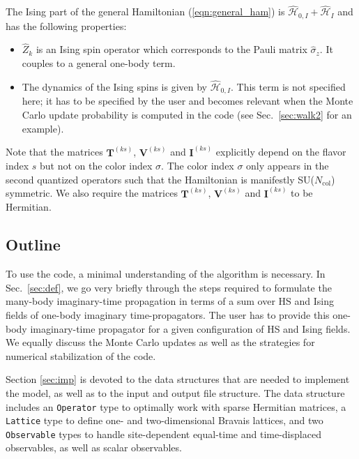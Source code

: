 The Ising part of the general Hamiltonian (\ref{eqn:general_ham}) is $\hat{\mathcal{H}}_{0,I}+ \hat{\mathcal{H}}_{I}$ and  has the following properties:
\begin{itemize}
\item $\hat{Z}_k$ is an Ising spin operator which corresponds to the Pauli matrix $\hat{\sigma}_{z}$. It couples to a general one-body term. 
\item  The dynamics of the Ising spins is given by $\hat{\mathcal{H}}_{0,I}$. This term is not specified here; 
it has to be specified by the user and becomes relevant when the Monte Carlo update probability is computed in the code (see Sec.~\ref{sec:walk2} for an example).
\end{itemize}
Note that the matrices  $\bm{T}^{(ks)}$,  $\bm{V}^{(ks)}$ and  $\bm{I}^{(ks)}$ explicitly depend on the flavor index $s$ but not on the color index $\sigma$. 
The color index $\sigma$ only appears in  the  second quantized operators such that the Hamiltonian is manifestly SU($N_{\mathrm{col}}$)    symmetric.  We also require
the matrices $\bm{T}^{(ks)}$,  $\bm{V}^{(ks)}$ and  $\bm{I}^{(ks)}$  to be  Hermitian.

\subsection{Outline}

To use the code, a minimal understanding of the algorithm is necessary. 
In Sec.~\ref{sec:def}, we go very briefly through  the steps required  to formulate the many-body imaginary-time propagation in terms of a sum  over HS and Ising fields  of one-body  imaginary time-propagators.   
The user has to provide this one-body imaginary-time propagator for a given configuration of   HS and  Ising fields. 
We equally discuss the Monte Carlo updates as well as the strategies for numerical stabilization of the code. 

Section \ref{sec:imp} is devoted to the data structures that are needed to implement the model, as well as to the input and output file structure.   
The data structure includes  an \texttt{Operator} type to  optimally work with sparse Hermitian matrices, a \texttt{Lattice} type  to define one- and two-dimensional Bravais lattices, and   two   \texttt{Observable} types to handle site-dependent equal-time and  time-displaced observables, as well as scalar observables. 

